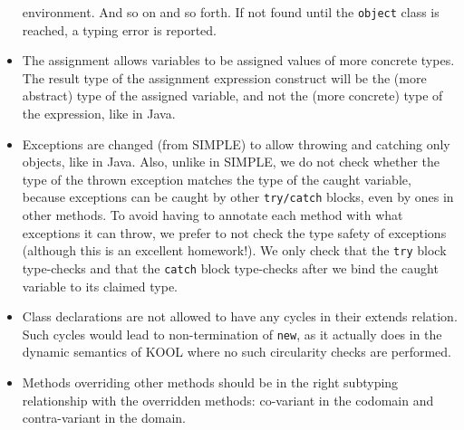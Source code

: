 \begin{kblock}[text]
\begin{itemize}
environment.  And so on and so forth.  If not found until the
\texttt{object} class is reached, a typing error is reported.
\item The assignment allows variables to be assigned values of
more concrete types.  The result type of the assignment expression
construct will be the (more abstract) type of the assigned variable,
and not the (more concrete) type of the expression, like in Java.
\item Exceptions are changed (from SIMPLE) to allow throwing and
catching only objects, like in Java.  Also, unlike in SIMPLE, we do
not check whether the type of the thrown exception matches the type of
the caught variable, because exceptions can be caught by other
\texttt{try/catch} blocks, even by ones in other methods.  To avoid
having to annotate each method with what exceptions it can throw, we
prefer to not check the type safety of exceptions (although this is an
excellent homework!).  We only check that the \texttt{try} block
type-checks and that the \texttt{catch} block type-checks after we bind
the caught variable to its claimed type.
\item Class declarations are not allowed to have any cycles in their
extends relation.  Such cycles would lead to non-termination of
\texttt{new}, as it actually does in the dynamic semantics of KOOL
where no such circularity checks are performed.
\item Methods overriding other methods should be in the right subtyping
relationship with the overridden methods: co-variant in the codomain
and contra-variant in the domain.
\end{itemize}

\end{kblock}

\vspace*{3ex}
